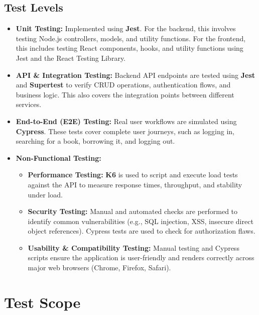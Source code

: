 \subsection{Test Levels}
\begin{itemize}
    \item \textbf{Unit Testing:} Implemented using \textbf{Jest}. For the backend, this involves testing Node.js controllers, models, and utility functions. For the frontend, this includes testing React components, hooks, and utility functions using Jest and the React Testing Library.
    \item \textbf{API \& Integration Testing:} Backend API endpoints are tested using \textbf{Jest} and \textbf{Supertest} to verify CRUD operations, authentication flows, and business logic. This also covers the integration points between different services.
    \item \textbf{End-to-End (E2E) Testing:} Real user workflows are simulated using \textbf{Cypress}. These tests cover complete user journeys, such as logging in, searching for a book, borrowing it, and logging out.
    \item \textbf{Non-Functional Testing:}
        \begin{itemize}
            \item \textbf{Performance Testing:} \textbf{K6} is used to script and execute load tests against the API to measure response times, throughput, and stability under load.
            \item \textbf{Security Testing:} Manual and automated checks are performed to identify common vulnerabilities (e.g., SQL injection, XSS, insecure direct object references). Cypress tests are used to check for authorization flaws.
            \item \textbf{Usability \& Compatibility Testing:} Manual testing and Cypress scripts ensure the application is user-friendly and renders correctly across major web browsers (Chrome, Firefox, Safari).
        \end{itemize}
\end{itemize}

\section{Test Scope}
